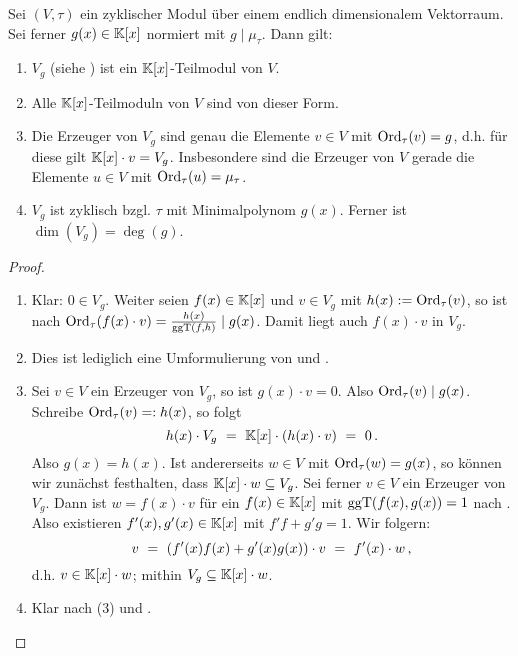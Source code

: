 \begin{satz}
  \label{satz:moduln_ueber_v_g}
  Sei $(V,\tau)$ ein zyklischer Modul über einem endlich dimensionalem
  Vektorraum. Sei ferner $g(x)\in \mathbb{K}[x]$ normiert mit $g\mid \mu_\tau$. 
  Dann gilt:
  \begin{enumerate}
    \item $V_g$ (siehe ) ist ein $\mathbb{K}[x]$-Teilmodul von $V$.
    \item Alle $\mathbb{K}[x]$-Teilmoduln von $V$ sind von dieser Form.
    \item Die Erzeuger von $V_g$ sind genau die Elemente $v\in V$ mit 
      $\operatorname{Ord}_\tau(v) = g$, d.h. für diese gilt
      $\mathbb{K}[x]\cdot v = V_g$.
      Insbesondere sind die Erzeuger von $V$ gerade die Elemente $u\in V$ mit
      $\operatorname{Ord}_\tau(u) = \mu_\tau$.
    \item $V_g$ ist zyklisch bzgl. $\tau$ mit Minimalpolynom $g(x)$.
      Ferner ist $\dim(V_g) = \deg(g)$.
  \end{enumerate}
\end{satz}
\begin{proof}
  \begin{enumerate}
    \item Klar: $0\in V_g$. Weiter seien $f(x) \in \mathbb{K}[x]$ und 
      $v \in V_g$ mit $h(x) := \operatorname{Ord}_\tau(v)$, 
      so ist nach 
      $\operatorname{Ord}_\tau(f(x)\cdot v) = \frac{h(x)}{\operatorname{ggT}(f,h)} \mid g(x)$.
      Damit liegt auch $f(x)\cdot v$ in $V_g$.
    \item Dies ist lediglich eine Umformulierung von
      und .
    \item Sei $v \in V$ ein Erzeuger von $V_g$, so ist 
      $g(x)\cdot v = 0$. Also $\operatorname{Ord}_\tau(v) \mid g(x)$. Schreibe
      $\operatorname{Ord}_\tau(v) =: h(x)$, so folgt
      \[ h(x)\cdot V_g \ =\  \mathbb{K}[x]\cdot (h(x)\cdot v) \ =\ 0\,.\]
      Also $g(x) = h(x)$.
      Ist andererseits $w \in V$ mit $\operatorname{Ord}_\tau(w) = g(x)$, 
      so können wir zunächst festhalten, dass $\mathbb{K}[x] \cdot w \subseteq V_g$.
      Sei ferner $v \in V$ ein Erzeuger von $V_g$. Dann ist $w = f(x)\cdot v$ für
      ein $f(x)\in \mathbb{K}[x]$ mit $\operatorname{ggT}(f(x),g(x)) = 1$ nach 
      . Also existieren
      $f'(x),g'(x)\in \mathbb{K}[x]$ mit $f'f + g'g = 1$. Wir folgern:
      \[ v \ =\  (f'(x)f(x) + g'(x)g(x)) \cdot v \ =\ 
        f'(x)\cdot w\,,\]
      d.h. $v \in \mathbb{K}[x]\cdot w$; mithin $V_g \subseteq \mathbb{K}[x]\cdot w$.
    \item Klar nach (3) und .
  \end{enumerate}
\end{proof}


